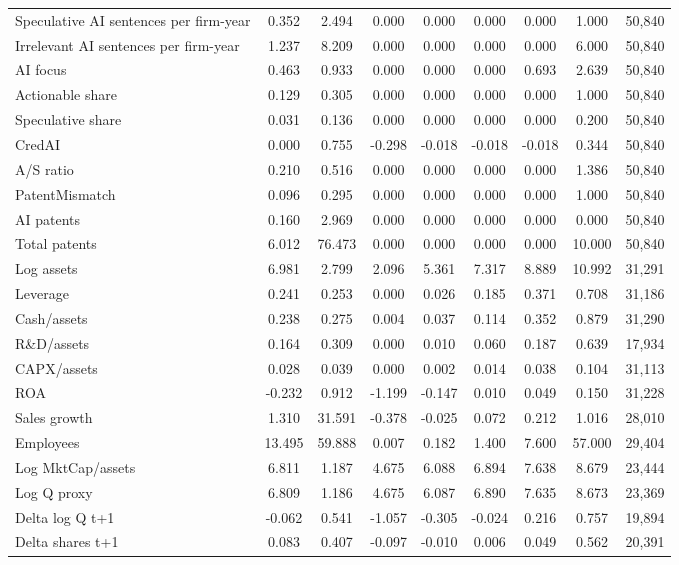 \begin{table}[!htbp]
\begin{tabular}{lcccccccc}
Speculative AI sentences per firm-year & 0.352 & 2.494 & 0.000 & 0.000 & 0.000 & 0.000 & 1.000 & 50,840 \\
Irrelevant AI sentences per firm-year & 1.237 & 8.209 & 0.000 & 0.000 & 0.000 & 0.000 & 6.000 & 50,840 \\
AI focus & 0.463 & 0.933 & 0.000 & 0.000 & 0.000 & 0.693 & 2.639 & 50,840 \\
Actionable share & 0.129 & 0.305 & 0.000 & 0.000 & 0.000 & 0.000 & 1.000 & 50,840 \\
Speculative share & 0.031 & 0.136 & 0.000 & 0.000 & 0.000 & 0.000 & 0.200 & 50,840 \\
CredAI & 0.000 & 0.755 & -0.298 & -0.018 & -0.018 & -0.018 & 0.344 & 50,840 \\
A/S ratio & 0.210 & 0.516 & 0.000 & 0.000 & 0.000 & 0.000 & 1.386 & 50,840 \\
PatentMismatch & 0.096 & 0.295 & 0.000 & 0.000 & 0.000 & 0.000 & 1.000 & 50,840 \\
AI patents & 0.160 & 2.969 & 0.000 & 0.000 & 0.000 & 0.000 & 0.000 & 50,840 \\
Total patents & 6.012 & 76.473 & 0.000 & 0.000 & 0.000 & 0.000 & 10.000 & 50,840 \\
Log assets & 6.981 & 2.799 & 2.096 & 5.361 & 7.317 & 8.889 & 10.992 & 31,291 \\
Leverage & 0.241 & 0.253 & 0.000 & 0.026 & 0.185 & 0.371 & 0.708 & 31,186 \\
Cash/assets & 0.238 & 0.275 & 0.004 & 0.037 & 0.114 & 0.352 & 0.879 & 31,290 \\
R\&D/assets & 0.164 & 0.309 & 0.000 & 0.010 & 0.060 & 0.187 & 0.639 & 17,934 \\
CAPX/assets & 0.028 & 0.039 & 0.000 & 0.002 & 0.014 & 0.038 & 0.104 & 31,113 \\
ROA & -0.232 & 0.912 & -1.199 & -0.147 & 0.010 & 0.049 & 0.150 & 31,228 \\
Sales growth & 1.310 & 31.591 & -0.378 & -0.025 & 0.072 & 0.212 & 1.016 & 28,010 \\
Employees & 13.495 & 59.888 & 0.007 & 0.182 & 1.400 & 7.600 & 57.000 & 29,404 \\
Log MktCap/assets & 6.811 & 1.187 & 4.675 & 6.088 & 6.894 & 7.638 & 8.679 & 23,444 \\
Log Q proxy & 6.809 & 1.186 & 4.675 & 6.087 & 6.890 & 7.635 & 8.673 & 23,369 \\
Delta log Q t+1 & -0.062 & 0.541 & -1.057 & -0.305 & -0.024 & 0.216 & 0.757 & 19,894 \\
Delta shares t+1 & 0.083 & 0.407 & -0.097 & -0.010 & 0.006 & 0.049 & 0.562 & 20,391 \\

\end{tabular}
\end{table}
